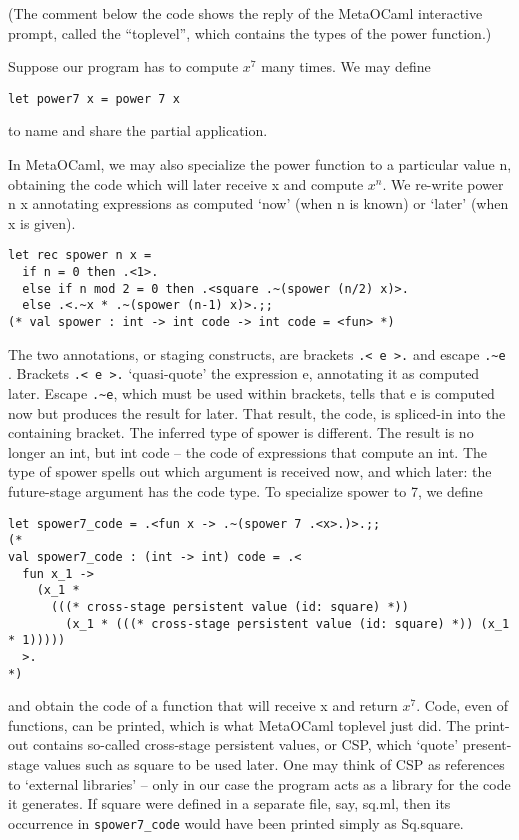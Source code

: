 \documentclass[12pt, titlepage]{article}
\begin{document}
(The comment below the code shows the reply of the MetaOCaml interactive 
prompt, called the ``toplevel'', which contains the types of the power 
function.)

Suppose our program has to compute $x^7$ many times. We may define
\begin{lstlisting}
let power7 x = power 7 x
\end{lstlisting}
to name and share the partial application.

In MetaOCaml, we may also specialize the power function to a particular value 
n, obtaining the code which will later receive x and compute $x^n$. We re-write 
power n x annotating expressions as computed `now' (when n is known) or `later' 
(when x is given).
\begin{lstlisting}
let rec spower n x =
  if n = 0 then .<1>.
  else if n mod 2 = 0 then .<square .~(spower (n/2) x)>.
  else .<.~x * .~(spower (n-1) x)>.;;
(* val spower : int -> int code -> int code = <fun> *)
\end{lstlisting}
The two annotations, or staging constructs, are brackets \lstinline|.< e >.| 
and escape \lstinline|.~e| 
. Brackets \lstinline|.< e >.| `quasi-quote' the expression e, annotating it as 
computed 
later. Escape \lstinline|.~e|, which must be used within brackets, tells that e 
is computed 
now but produces the result for later. That result, the code, is spliced-in 
into the containing bracket. The inferred type of spower is different. The 
result is no longer an int, but int code -- the code of expressions that 
compute an int. The type of spower spells out which argument is received now, 
and which later: the future-stage argument has the code type. To specialize 
spower to 7, we define
\begin{lstlisting}
let spower7_code = .<fun x -> .~(spower 7 .<x>.)>.;;
(*
val spower7_code : (int -> int) code = .<
  fun x_1 ->
    (x_1 *
      (((* cross-stage persistent value (id: square) *))
        (x_1 * (((* cross-stage persistent value (id: square) *)) (x_1 * 1)))))
  >.
*)
\end{lstlisting}
and obtain the code of a function that will receive x and return $x^7$. Code, 
even of functions, can be printed, which is what MetaOCaml toplevel just did. 
The print-out contains so-called cross-stage persistent values, or CSP, which 
`quote' present-stage values such as square to be used later. One may think of 
CSP as references to `external libraries' -- only in our case the program acts 
as a library for the code it generates. If square were defined in a separate 
file, say, sq.ml, then its occurrence in \lstinline|spower7_code| would have 
been printed 
simply as Sq.square.
\end{document}
